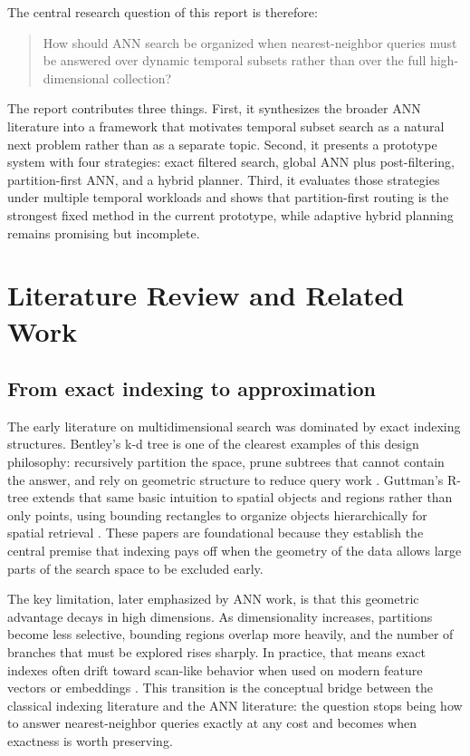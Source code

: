 \documentclass[sigconf,nonacm]{acmart}
\begin{document}
The central research question of this report is therefore:

\begin{quote}
How should ANN search be organized when nearest-neighbor queries must be answered over dynamic temporal subsets rather than over the full high-dimensional collection?
\end{quote}

The report contributes three things. First, it synthesizes the broader ANN literature into a framework that motivates temporal subset search as a natural next problem rather than as a separate topic. Second, it presents a prototype system with four strategies: exact filtered search, global ANN plus post-filtering, partition-first ANN, and a hybrid planner. Third, it evaluates those strategies under multiple temporal workloads and shows that partition-first routing is the strongest fixed method in the current prototype, while adaptive hybrid planning remains promising but incomplete.

\section{Literature Review and Related Work}

\subsection{From exact indexing to approximation}

The early literature on multidimensional search was dominated by exact indexing structures. Bentley's k-d tree is one of the clearest examples of this design philosophy: recursively partition the space, prune subtrees that cannot contain the answer, and rely on geometric structure to reduce query work \cite{bentley1975}. Guttman's R-tree extends that same basic intuition to spatial objects and regions rather than only points, using bounding rectangles to organize objects hierarchically for spatial retrieval \cite{guttman1984}. These papers are foundational because they establish the central premise that indexing pays off when the geometry of the data allows large parts of the search space to be excluded early.

The key limitation, later emphasized by ANN work, is that this geometric advantage decays in high dimensions. As dimensionality increases, partitions become less selective, bounding regions overlap more heavily, and the number of branches that must be explored rises sharply. In practice, that means exact indexes often drift toward scan-like behavior when used on modern feature vectors or embeddings \cite{indyk1998,gionis1999,andoni2018}. This transition is the conceptual bridge between the classical indexing literature and the ANN literature: the question stops being how to answer nearest-neighbor queries exactly at any cost and becomes when exactness is worth preserving.
\end{document}
